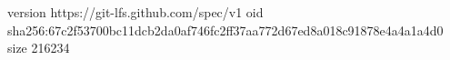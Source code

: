 version https://git-lfs.github.com/spec/v1
oid sha256:67c2f53700bc11dcb2da0af746fc2ff37aa772d67ed8a018c91878e4a4a1a4d0
size 216234
